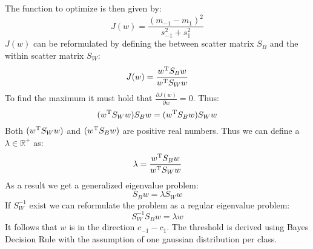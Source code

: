 The function to optimize is then given by:
\begin{equation*}
    J(w) = \frac{{(m_{-1} - m_1)}^2}{s_{-1}^2 + s_1^2}
\end{equation*}
$J(w)$ can be reformulated by defining the between scatter matrix $S_B$ and the within scatter matrix $S_W$:
\begin{equation*}
    J(w) = \frac{w^\text{T} S_B w}{w^\text{T} S_W w}
\end{equation*}
To find the maximum it must hold that $\frac{\partial J(w)}{\partial w} = 0$. Thus:
\begin{equation*}
    (w^\text{T} S_W w) S_B w = (w^\text{T} S_B w) S_W w
\end{equation*}
Both $(w^\text{T} S_W w)$ and $(w^\text{T} S_B w)$ are positive real numbers.
Thus we can define a $\lambda \in \mathbb{R}^+$ as:
\begin{equation*}
    \lambda = \frac{w^\text{T} S_B w}{w^\text{T} S_W w}
\end{equation*}
As a result we get a generalized eigenvalue problem:
\begin{equation*}
    S_B w = \lambda S_W w
\end{equation*}
If $S_W^{-1}$ exist we can reformulate the problem as a regular eigenvalue problem:
\begin{equation*}
    S_W^{-1} S_B w = \lambda w
\end{equation*}
It follows that $w$ is in the direction $c_{-1} - c_1$. The threshold is derived using Bayes Decision Rule with the assumption of one gaussian distribution per class.
